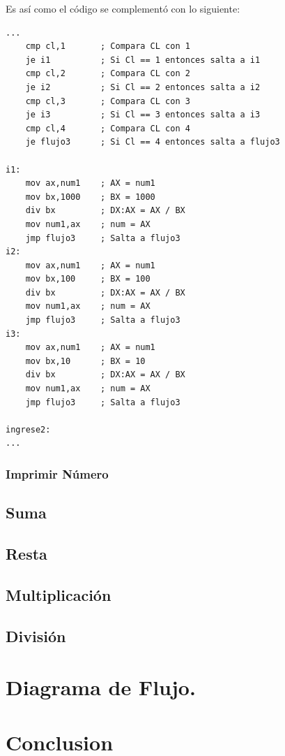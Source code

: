 \documentclass[letter,12 pt,titlepage]{article}
\begin{document}
    Es así como el código se complementó con lo siguiente:

    \begin{verbatim}
...
    cmp cl,1       ; Compara CL con 1
    je i1          ; Si Cl == 1 entonces salta a i1
    cmp cl,2       ; Compara CL con 2
    je i2          ; Si Cl == 2 entonces salta a i2
    cmp cl,3       ; Compara CL con 3
    je i3          ; Si Cl == 3 entonces salta a i3
    cmp cl,4       ; Compara CL con 4
    je flujo3      ; Si Cl == 4 entonces salta a flujo3  

i1:
    mov ax,num1    ; AX = num1
    mov bx,1000    ; BX = 1000
    div bx         ; DX:AX = AX / BX
    mov num1,ax    ; num = AX
    jmp flujo3     ; Salta a flujo3  
i2:
    mov ax,num1    ; AX = num1
    mov bx,100     ; BX = 100
    div bx         ; DX:AX = AX / BX
    mov num1,ax    ; num = AX
    jmp flujo3     ; Salta a flujo3  
i3:
    mov ax,num1    ; AX = num1
    mov bx,10      ; BX = 10
    div bx         ; DX:AX = AX / BX
    mov num1,ax    ; num = AX
    jmp flujo3     ; Salta a flujo3  

ingrese2:
...
    \end{verbatim}
    \subsubsection{Imprimir Número}
    \subsection{Suma}
    \subsection{Resta}
    \subsection{Multiplicación}
    \subsection{División}


    \section{Diagrama de Flujo.}

    

    \section{Conclusion}

    
\end{document}
